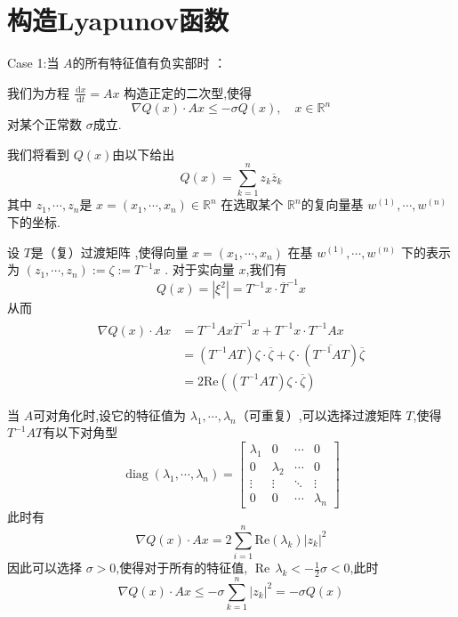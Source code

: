\documentclass[lang=cn,12pt,color=green,fontset=none]{elegantbook}
\begin{document}
\section{构造Lyapunov函数}


\begin{large}
    \noindent Case 1:当 $ A $的所有特征值有负实部时 ：


\end{large}

我们为方程 $ \frac{\,\mathrm{d} x }{\,\mathrm{d} t }= Ax  $ 构造正定的二次型,使得 $$
\nabla Q\left( x \right)\cdot Ax \le -\sigma Q\left( x \right),\quad  x \in \mathbb{R} ^{n} 
$$对某个正常数 $ \sigma  $成立. 

我们将看到 $ Q\left( x \right)  $由以下给出 $$
Q\left( x \right)=\sum _{k=1}^{n}z_{k} \overline{z}_{k} 
$$其中 $ z_1,\cdots ,z_{n} $是 $ x = \left( x_1,\cdots ,x_{n} \right)   \in \mathbb{R} ^{n}$   在选取某个 $ \mathbb{R} ^{n} $的复向量基 $ w^{\left( 1 \right) },\cdots ,w^{\left( n \right) } $下的坐标.

设 $ T $是（复）过渡矩阵 ,使得向量 $ x = \left( x_1,\cdots ,x_{n} \right)  $ 在基 $ w^{\left( 1 \right) },\cdots ,w^{\left( n \right) } $ 下的表示为 $ \left( z_1,\cdots ,z_{n} \right)  :=\zeta := T^{-1} x$ .
对于实向量 $ x $,我们有 $$
Q\left( x \right) = \left|  \xi ^{2} \right| = T^{-1} x\cdot \overline{T}^{-1} x  
$$ 从而 $$
\begin{aligned}
    \nabla Q\left( x \right)\cdot Ax & = T^{-1} Ax \overline{T}^{-1} x+  T^{-1} x\cdot  T^{-1} Ax \\ 
     & = \left( T^{-1} AT \right) \zeta \cdot \overline{\zeta }+  \zeta \cdot \left( \overline{T^{-1} AT}  \right) \overline{\zeta }\\ 
      & = 2 \mathrm{Re}\left( \left( T^{-1} AT \right)\zeta \cdot \overline{\zeta }  \right)   
\end{aligned} 
$$

当  $ A $可对角化时,设它的特征值为 $  \lambda _{1},\cdots , \lambda _{n} $（可重复）,可以选择过渡矩阵 $ T $,使得 $ T^{-1} AT $有以下对角型 $$
\operatorname{diag}\left(  \lambda _{1},\cdots , \lambda _{n} \right) = \begin{bmatrix} 
     \lambda _{1} & 0& \cdots & 0\\ 
      0 &  \lambda _{2} & \cdots  & 0\\ 
       \vdots& \vdots & \ddots & \vdots\\ 
        0& 0& \cdots &  \lambda _{n} 
\end{bmatrix}  
$$    此时有 $$
\nabla Q\left( x \right)\cdot Ax = 2\sum _{i=1}^{n} \mathrm{Re}\left(  \lambda _{k} \right)\left| z_{k} \right|^{2}   
$$ 因此可以选择 $ \sigma >0 $,使得对于所有的特征值, $ \operatorname{Re}\, \lambda _{k}< - \frac{1}{2}\sigma <0 $,此时 $$
\nabla Q\left( x \right)\cdot Ax\le  -\sigma  \sum _{k=1}^{n} \left| z_{k} \right|^{2} = -\sigma  Q\left( x \right)   
$$  
\end{document}

